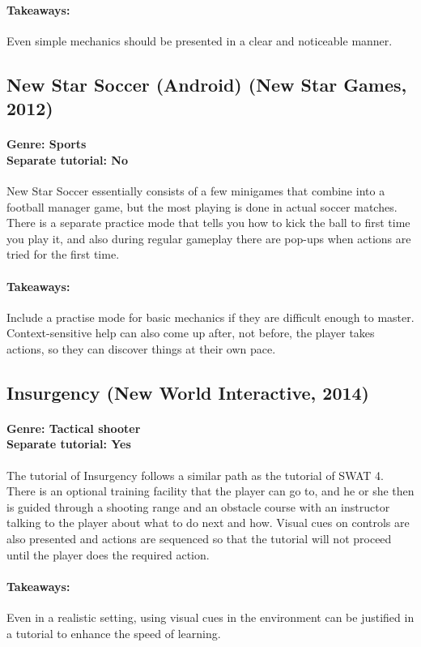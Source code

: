 \paragraph{Takeaways:}
Even simple mechanics should be presented in a clear and noticeable manner.

\subsection{New Star Soccer (Android) (New Star Games, 2012)}
\paragraph{Genre: Sports \\ Separate tutorial: No \\}
New Star Soccer essentially consists of a few minigames that combine into a football manager game, but the most playing is done in actual soccer matches. There is a separate practice mode that tells you how to kick the ball to first time you play it, and also during regular gameplay there are pop-ups when actions are tried for the first time.
\paragraph{Takeaways:}
Include a practise mode for basic mechanics if they are difficult enough to master.
Context-sensitive help can also come up after, not before, the player takes actions, so they can discover things at their own pace.

\subsection{Insurgency (New World Interactive, 2014)}
\paragraph{Genre: Tactical shooter \\ Separate tutorial: Yes \\}
The tutorial of Insurgency follows a similar path as the tutorial of SWAT 4. There is an optional training facility that the player can go to, and he or she then is guided through a shooting range and an obstacle course with an instructor talking to the player about what to do next and how. Visual cues on controls are also presented and actions are sequenced so that the tutorial will not proceed until the player does the required action. 
\paragraph{Takeaways:}
Even in a realistic setting, using visual cues in the environment can be justified in a tutorial to enhance the speed of learning.

